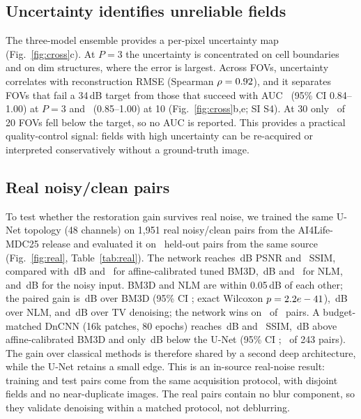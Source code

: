 \documentclass[preprint,12pt]{elsarticle}
\begin{document}
\subsection{Uncertainty identifies unreliable fields}
The three-model ensemble provides a per-pixel uncertainty map
(Fig.~\ref{fig:cross}c). At $P=3$ the uncertainty is concentrated on
cell boundaries and on dim structures, where the error is largest. Across FOVs,
uncertainty correlates with reconstruction RMSE (Spearman $\rho=0.92$), and
it separates FOVs that fail a 34\,dB target from those that succeed with AUC
\AucThree\ (95\% CI 0.84--1.00) at $P=3$ and \AucTen\ (0.85--1.00) at 10
(Fig.~\ref{fig:cross}b,e; SI S4). At 30 only
\NFailThirty\ of 20 FOVs fell below the target, so no AUC is reported. This provides a practical quality-control signal: fields with high
uncertainty can be re-acquired or interpreted conservatively without a
ground-truth image.



\begin{table}[H]
\centering
\caption{Cross-dataset PSNR at $P=30$. BBBC014 uses its 20 test
FOVs; each external dataset is split into five validation fields for TV tuning
and 15 held-out fields for evaluation. The model is trained only on BBBC014
channel~1 and external evaluation is zero-shot; TV deconvolution is tuned per
dataset on its five validation fields.}
\label{tab:cross}

\end{table}

\subsection{Real noisy/clean pairs}
To test whether the restoration gain survives real noise, we trained the same
U-Net topology (48 channels) on 1{,}951 real noisy/clean pairs from the
AI4Life-MDC25 release
and evaluated it on \RealN\ held-out pairs from the same source
(Fig.~\ref{fig:real}, Table~\ref{tab:real}). The network reaches
\RealUnetP\,dB PSNR and \RealUnetS\ SSIM, compared with \RealBMThreeP\,dB and
\RealBMThreeS\ for affine-calibrated tuned BM3D, \RealNlmP\,dB and \RealNlmS\ for NLM, and
\RealNoisyP\,dB for the noisy input. BM3D and NLM are within 0.05\,dB of each
other; the paired gain is \RealGain\,dB over BM3D (95\% CI \RealCI; exact
Wilcoxon $p=2.2e-41$), \RealGainNlm\,dB over NLM, and \RealGainTv\,dB over
TV denoising; the network wins on \RealWins\ of \RealN\ pairs. A budget-matched
DnCNN (16k patches, 80 epochs) reaches \RealDncnnP\,dB and \RealDncnnS\ SSIM,
\RealDncnnGain\,dB above affine-calibrated BM3D and only
\RealUnetGainDncnn\,dB below the U-Net (95\% CI \RealUnetDncnnCI;
\RealUnetDncnnWins\ of 243 pairs). The gain over classical methods is therefore
shared by a second deep architecture, while the U-Net retains a small edge. This is an
in-source real-noise result: training and test pairs come from the same
acquisition protocol, with disjoint fields and no near-duplicate images. The
real pairs contain no blur component, so they validate denoising within a
matched protocol, not deblurring.
\end{document}
